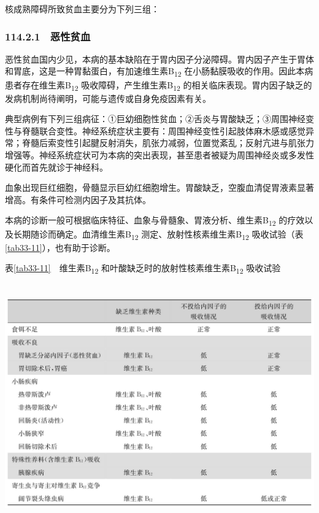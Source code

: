 核成熟障碍所致贫血主要分为下列三组：

\subsubsection{114.2.1　恶性贫血}

恶性贫血国内少见，本病的基本缺陷在于胃内因子分泌障碍。胃内因子产生于胃体和胃底，这是一种胃黏蛋白，有加速维生素B\textsubscript{12}
在小肠黏膜吸收的作用。因此本病患者存在维生素B\textsubscript{12}
吸收障碍，产生维生素B\textsubscript{12}
的相关临床表现。胃内因子缺乏的发病机制尚待阐明，可能与遗传或自身免疫因素有关。

典型病例有下列三组病征：①巨幼细胞性贫血；②舌炎与胃酸缺乏；③周围神经变性与脊髓联合变性。神经系统症状主要有：周围神经变性引起肢体麻木感或感觉异常；脊髓后索变性引起腱反射消失，肌张力减弱，位置觉紊乱；反射亢进与肌张力增强等。神经系统症状可为本病的突出表现，甚至患者被疑为周围神经炎或多发性硬化而首先就诊于神经科。

血象出现巨红细胞，骨髓显示巨幼红细胞增生。胃酸缺乏，空腹血清促胃液素显著增高。有条件可检测内因子及其抗体。

本病的诊断一般可根据临床特征、血象与骨髓象、胃液分析、维生素B\textsubscript{12}
的疗效以及长期随诊而确定。血清维生素B\textsubscript{12}
测定、放射性核素维生素B\textsubscript{12}
吸收试验（表\ref{tab33-11}），也有助于诊断。

表\ref{tab33-11}　维生素B\textsubscript{12}
和叶酸缺乏时的放射性核素维生素B\textsubscript{12} 吸收试验

\includegraphics[width=5.92708in,height=4.03125in]{./images/Image00187.jpg}

